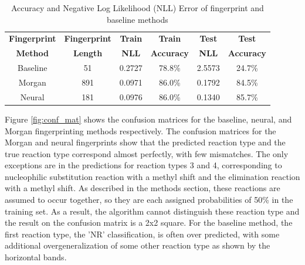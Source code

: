 \begin{table}
    \centering
    \label{tab:cross_val_results}
    \begin{tabular}{|c|c|c|c|c|c|}%
        \hline
         \textbf{Fingerprint} & \textbf{Fingerprint} & \textbf{Train} & \textbf{Train} & \textbf{Test} &  \textbf{Test} \\ 
         \textbf{Method} & \textbf{Length} & \textbf{NLL} & \textbf{Accuracy} & \textbf{NLL} & \textbf{Accuracy} \\
        \hline
        Baseline & 51 & 0.2727 & 78.8\% & 2.5573 & 24.7\%  \\ 
        \hline
        Morgan  & 891 & 0.0971 & 86.0\%  & 0.1792 & 84.5\%  \\ 
        Neural  &  181 & 0.0976 & 86.0\% & 0.1340 & 85.7\% \\ 
        \hline
    \end{tabular} 
    \caption{Accuracy and Negative Log Likelihood (NLL) Error of fingerprint and baseline methods} 
\end{table}  

Figure \ref{fig:conf_mat} shows the confusion matrices for the baseline, neural, and Morgan fingerprinting methods respectively. The confusion matrices for the Morgan and neural fingerprints show that the predicted reaction type and the true reaction type correspond almost perfectly, with few mismatches. The only exceptions are in the predictions for reaction types 3 and 4, corresponding to nucleophilic substitution reaction with a methyl shift and the elimination reaction with a methyl shift. As described in the methods section, these reactions are assumed to occur together, so they are each assigned probabilities of 50\% in the training set. As a result, the algorithm cannot distinguish these reaction type and the result on the confusion matrix is a 2x2 square. For the baseline method, the first reaction type, the 'NR' classification, is often over predicted, with some additional overgeneralization of some other reaction type as shown by the horizontal bands.


